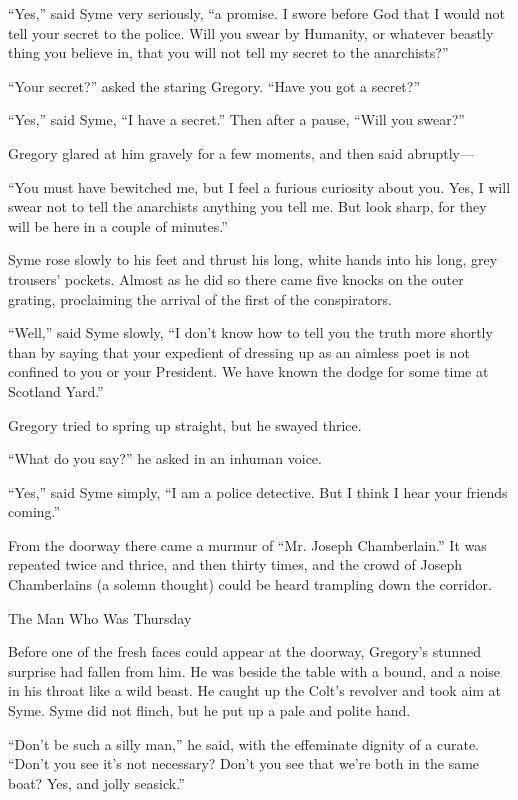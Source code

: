 “Yes,” said Syme very seriously, “a promise. I swore before God that I would not tell your secret to the police. Will you swear by Humanity, or whatever beastly thing you believe in, that you will not tell my secret to the anarchists?”

“Your secret?” asked the staring Gregory. “Have you got a secret?”

“Yes,” said Syme, “I have a secret.” Then after a pause, “Will you swear?”

Gregory glared at him gravely for a few moments, and then said abruptly⁠—

“You must have bewitched me, but I feel a furious curiosity about you. Yes, I will swear not to tell the anarchists anything you tell me. But look sharp, for they will be here in a couple of minutes.”

Syme rose slowly to his feet and thrust his long, white hands into his long, grey trousers’ pockets. Almost as he did so there came five knocks on the outer grating, proclaiming the arrival of the first of the conspirators.

“Well,” said Syme slowly, “I don’t know how to tell you the truth more shortly than by saying that your expedient of dressing up as an aimless poet is not confined to you or your President. We have known the dodge for some time at Scotland Yard.”

Gregory tried to spring up straight, but he swayed thrice.

“What do you say?” he asked in an inhuman voice.

“Yes,” said Syme simply, “I am a police detective. But I think I hear your friends coming.”

From the doorway there came a murmur of “Mr. Joseph Chamberlain.” It was repeated twice and thrice, and then thirty times, and the crowd of Joseph Chamberlains (a solemn thought) could be heard trampling down the corridor.

\chap The Man Who Was Thursday

Before one of the fresh faces could appear at the doorway, Gregory’s stunned surprise had fallen from him. He was beside the table with a bound, and a noise in his throat like a wild beast. He caught up the Colt’s revolver and took aim at Syme. Syme did not flinch, but he put up a pale and polite hand.

“Don’t be such a silly man,” he said, with the effeminate dignity of a curate. “Don’t you see it’s not necessary? Don’t you see that we’re both in the same boat? Yes, and jolly seasick.”

